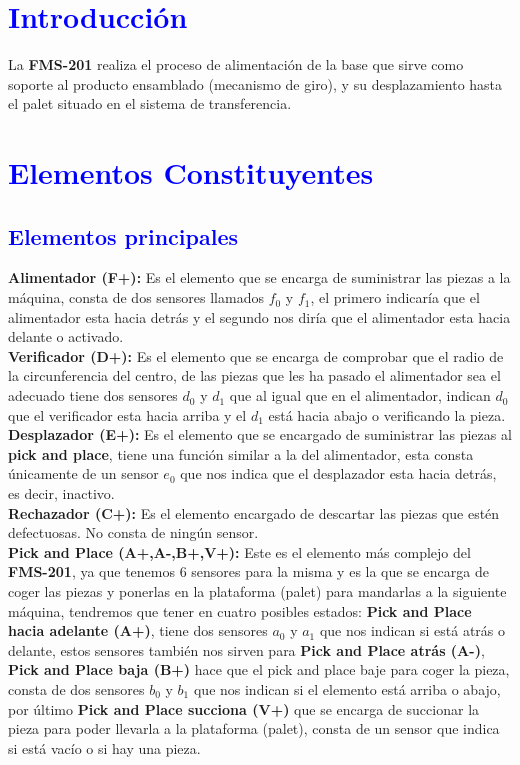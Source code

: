 \section{{\textcolor{blue}{Introducción}}}

La \textbf{FMS-201} realiza el proceso de alimentación de la base que sirve como soporte al producto ensamblado (mecanismo de giro), y su desplazamiento hasta el palet situado en el sistema de transferencia.
\section{\textcolor{blue}{Elementos Constituyentes}}
\subsection{\textcolor{blue}{Elementos principales}}

\textbf{Alimentador (F+):} Es el elemento que se encarga de suministrar las piezas a la máquina, consta de dos sensores llamados \textbf{$f_0$} y \textbf{$f_1$}, el primero indicaría que el alimentador esta hacia detrás y el segundo nos diría que el alimentador esta hacia delante o activado.\\

\textbf{Verificador (D+):} Es el elemento que se encarga de comprobar que el radio de la circunferencia del centro, de las piezas que les ha pasado el alimentador sea el adecuado tiene dos sensores \textbf{$d_0$} y \textbf{$d_1$} que al igual que en el alimentador, indican \textbf{$d_0$} que el verificador esta hacia arriba y el \textbf{$d_1$} está hacia abajo o verificando la pieza.\\

\textbf{Desplazador (E+):} Es el elemento que se encargado de suministrar las piezas al \textbf{pick and place}, tiene una función similar a la del alimentador, esta consta únicamente de un sensor \textbf{$e_0$} que nos indica que el desplazador esta hacia detrás, es decir, inactivo.\\

\textbf{Rechazador (C+): }Es el elemento encargado de descartar las piezas que estén defectuosas. No consta de ningún sensor.\\

\textbf{Pick and Place (A+,A-,B+,V+):} Este es el elemento más complejo del \textbf{FMS-201}, ya que tenemos 6 sensores para la misma y es la que se encarga de coger las piezas y ponerlas en la plataforma (palet) para mandarlas a la siguiente máquina, tendremos que tener en cuatro posibles estados: \textbf{Pick and Place hacia adelante (A+)}, tiene dos sensores \textbf{$a_0$} y \textbf{$a_1$} que nos indican si está atrás o delante, estos sensores también nos sirven para \textbf{Pick and Place atrás (A-)}, \textbf{Pick and Place baja (B+)} hace que el pick and place baje para coger la pieza, consta de dos sensores \textbf{$b_0$} y \textbf{$b_1$} que nos indican si el elemento está arriba o abajo, por último \textbf{Pick and Place succiona (V+)} que se encarga de succionar la pieza para poder llevarla a la plataforma (palet), consta de un sensor que indica si está vacío o si hay una pieza.\\

